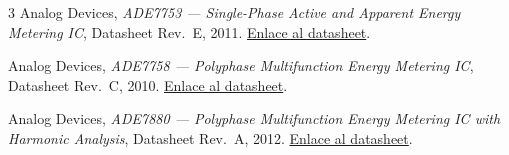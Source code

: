 \documentclass[12pt,a4paper]{article}
\begin{document}
\begin{thebibliography}{3}
    Analog Devices, \textit{ADE7753 --- Single-Phase Active and Apparent Energy
    Metering IC}, Datasheet Rev.~E, 2011.
    \href{https://www.analog.com/media/en/technical-documentation/data-sheets/ADE7753.pdf}
         {Enlace al datasheet}.

    Analog Devices, \textit{ADE7758 --- Polyphase Multifunction Energy Metering IC},
    Datasheet Rev.~C, 2010.
    \href{https://www.analog.com/media/en/technical-documentation/data-sheets/ADE7758.pdf}
         {Enlace al datasheet}.

    Analog Devices, \textit{ADE7880 --- Polyphase Multifunction Energy Metering IC
    with Harmonic Analysis}, Datasheet Rev.~A, 2012.
    \href{https://www.analog.com/media/en/technical-documentation/data-sheets/ADE7880.pdf}
         {Enlace al datasheet}.
\end{thebibliography}
\end{document}
